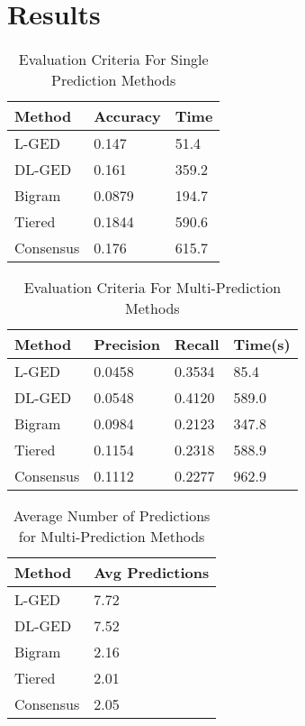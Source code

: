 \documentclass[11pt]{article}
\begin{document}
\section{Results}

\begin{table}[h]
 \begin{center}
\begin{tabular}{|l|l|l|}
      \hline
      Method & Accuracy & Time\\
      \hline\hline
      L-GED & 0.147 & 51.4 \\
      DL-GED & 0.161 & 359.2 \\
      Bigram  & 0.0879 & 194.7 \\
      Tiered & 0.1844 & 590.6 \\
      Consensus & 0.176 & 615.7 \\
      \hline
\end{tabular}
\caption{Evaluation Criteria For Single Prediction Methods}\label{table1}
 \end{center}
\end{table}

\begin{table}[h]
 \begin{center}
\begin{tabular}{|l|l|l|l|}
      \hline
      Method & Precision & Recall & Time(s)\\
      \hline\hline
      L-GED & 0.0458 & 0.3534 & 85.4 \\
      DL-GED & 0.0548 & 0.4120 & 589.0 \\
      Bigram & 0.0984 & 0.2123 & 347.8 \\
	  Tiered & 0.1154 & 0.2318 & 588.9 \\
	  Consensus & 0.1112 & 0.2277 & 962.9 \\    
      \hline
\end{tabular}
\caption{Evaluation Criteria For Multi-Prediction Methods}\label{table2}
 \end{center}
\end{table}

\begin{table}[h]
 \begin{center}
\begin{tabular}{|l|l|}
      \hline
      Method & Avg Predictions\\
      \hline\hline
      L-GED & 7.72 \\
      DL-GED & 7.52 \\
      Bigram & 2.16 \\
	  Tiered & 2.01 \\
	  Consensus & 2.05 \\    
      \hline
\end{tabular}
\caption{Average Number of Predictions for Multi-Prediction Methods}\label{table2}
 \end{center}
\end{table}
\end{document}
